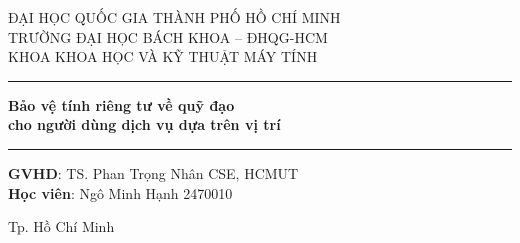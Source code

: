 \documentclass[12pt,a4paper,oneside]{report}
\begin{document}
\hypersetup{pageanchor=false}

\begin{titlepage}
\centering
{\large ĐẠI HỌC QUỐC GIA THÀNH PHỐ HỒ CHÍ MINH\\
TRƯỜNG ĐẠI HỌC BÁCH KHOA -- ĐHQG-HCM\\
KHOA KHOA HỌC VÀ KỸ THUẬT MÁY TÍNH\par}
\vspace{3.6cm}
\rule{0.72\textwidth}{0.4pt}\par
\vspace{0.8cm}
{\bfseries\LARGE Bảo vệ tính riêng tư về quỹ đạo\\
cho người dùng dịch vụ dựa trên vị trí\par}
\vspace{0.8cm}
\rule{0.72\textwidth}{0.4pt}\par
\vspace{2.7cm}
\begin{flushleft}
\hspace{2cm}\textbf{GVHD}: TS. Phan Trọng Nhân \hfill CSE, HCMUT\hspace{2cm}\mbox{}\\[6pt]
\hspace{2cm}\textbf{Học viên}: Ngô Minh Hạnh \hfill 2470010\hspace{2cm}\mbox{}
\end{flushleft}
\vfill
{Tp. Hồ Chí Minh\par}
\end{titlepage}

\hypersetup{pageanchor=true}
\tableofcontents
\listoffigures
\listoftables
\end{document}
